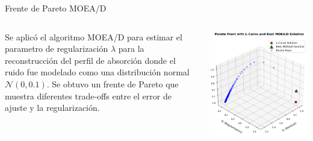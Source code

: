 \documentclass[aspectratio=169,xcolor=dvipsnames]{beamer}
\begin{document}
\begin{frame}{Frente de Pareto MOEA/D}
    \begin{columns}
        \justifying
        Se aplicó el algoritmo MOEA/D para estimar el parametro de regularización $\lambda$ para la reconstrucción del perfil de absorción donde el ruido fue modelado como una distribución normal $\mathcal{N}(0, 0.1)$. Se obtuvo un frente de Pareto que muestra diferentes trade-offs entre el error de ajuste y la regularización.

        \centering
        \includegraphics[width=\textwidth]{img/pareto_front_moead.png} \label{fig:pareto_moead}
    \end{columns}
\end{frame}

\end{document}
